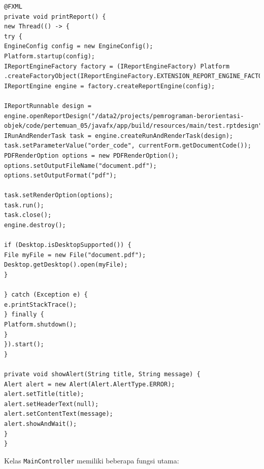 \begin{lstlisting}[style=JavaStyle]
@FXML
private void printReport() {
new Thread(() -> {
try {
EngineConfig config = new EngineConfig();
Platform.startup(config);
IReportEngineFactory factory = (IReportEngineFactory) Platform
.createFactoryObject(IReportEngineFactory.EXTENSION_REPORT_ENGINE_FACTORY);
IReportEngine engine = factory.createReportEngine(config);

IReportRunnable design = engine.openReportDesign("/data2/projects/pemrograman-berorientasi-objek/code/pertemuan_05/javafx/app/build/resources/main/test.rptdesign");
IRunAndRenderTask task = engine.createRunAndRenderTask(design);
task.setParameterValue("order_code", currentForm.getDocumentCode());
PDFRenderOption options = new PDFRenderOption();
options.setOutputFileName("document.pdf");
options.setOutputFormat("pdf");

task.setRenderOption(options);
task.run();
task.close();
engine.destroy();

if (Desktop.isDesktopSupported()) {
File myFile = new File("document.pdf");
Desktop.getDesktop().open(myFile);
}

} catch (Exception e) {
e.printStackTrace();
} finally {
Platform.shutdown();
}
}).start();
}

private void showAlert(String title, String message) {
Alert alert = new Alert(Alert.AlertType.ERROR);
alert.setTitle(title);
alert.setHeaderText(null);
alert.setContentText(message);
alert.showAndWait();
}
}
\end{lstlisting}

Kelas \texttt{MainController} memiliki beberapa fungsi utama:

